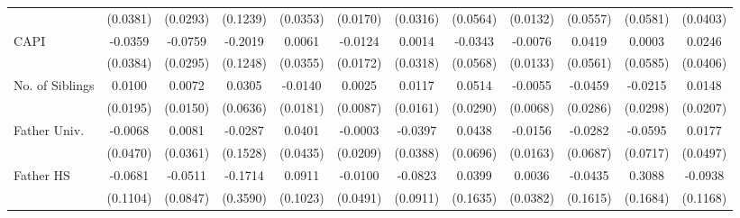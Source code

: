 \begin{table}[htbp]
\begin{tabular}{l*{11}{c}}
            &    (0.0381)         &    (0.0293)         &    (0.1239)         &    (0.0353)         &    (0.0170)         &    (0.0316)         &    (0.0564)         &    (0.0132)         &    (0.0557)         &    (0.0581)         &    (0.0403)         \\
\addlinespace
CAPI        &     -0.0359         &     -0.0759\sym{*}  &     -0.2019         &      0.0061         &     -0.0124         &      0.0014         &     -0.0343         &     -0.0076         &      0.0419         &      0.0003         &      0.0246         \\
            &    (0.0384)         &    (0.0295)         &    (0.1248)         &    (0.0355)         &    (0.0172)         &    (0.0318)         &    (0.0568)         &    (0.0133)         &    (0.0561)         &    (0.0585)         &    (0.0406)         \\
\addlinespace
No. of Siblings&      0.0100         &      0.0072         &      0.0305         &     -0.0140         &      0.0025         &      0.0117         &      0.0514         &     -0.0055         &     -0.0459         &     -0.0215         &      0.0148         \\
            &    (0.0195)         &    (0.0150)         &    (0.0636)         &    (0.0181)         &    (0.0087)         &    (0.0161)         &    (0.0290)         &    (0.0068)         &    (0.0286)         &    (0.0298)         &    (0.0207)         \\
\addlinespace
Father Univ.&     -0.0068         &      0.0081         &     -0.0287         &      0.0401         &     -0.0003         &     -0.0397         &      0.0438         &     -0.0156         &     -0.0282         &     -0.0595         &      0.0177         \\
            &    (0.0470)         &    (0.0361)         &    (0.1528)         &    (0.0435)         &    (0.0209)         &    (0.0388)         &    (0.0696)         &    (0.0163)         &    (0.0687)         &    (0.0717)         &    (0.0497)         \\
\addlinespace
Father HS   &     -0.0681         &     -0.0511         &     -0.1714         &      0.0911         &     -0.0100         &     -0.0823         &      0.0399         &      0.0036         &     -0.0435         &      0.3088         &     -0.0938         \\
            &    (0.1104)         &    (0.0847)         &    (0.3590)         &    (0.1023)         &    (0.0491)         &    (0.0911)         &    (0.1635)         &    (0.0382)         &    (0.1615)         &    (0.1684)         &    (0.1168)         \\

\end{tabular}
\end{table}
